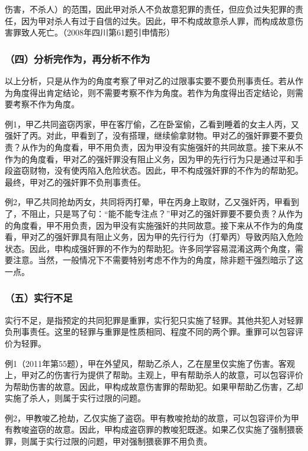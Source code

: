 伤害，不杀人）的范围，因此甲对杀人不负故意犯罪的责任，但应负过失犯罪的责任，因为甲对杀人有过于自信的过失。因此，甲不构成故意杀人罪，而构成故意伤害罪致人死亡。（2008年四川第61题引申情形）

\subsubsection*{（四）分析完作为，再分析不作为}

以上分析，只是从作为的角度考察了甲对乙的过限事实要不要负刑事责任。若从作为角度得出肯定结论，则不需要考察不作为角度。若作为角度得出否定结论，则需要考察不作为角度。

例1，甲乙共同盗窃丙家，甲在客厅偷，乙在卧室偷，乙看到睡着的女主人丙，又强奸了丙。对此，甲看到了，没有搭理，继续偷拿财物。甲对乙的强奸罪要不要负责？从作为的角度看，甲不用负责，因为甲没有实施强奸的共同故意。接下来从不作为的角度看，甲对乙的强奸罪没有阻止义务，因为甲的先行行为只是通过平和手段盗窃财物，没有使丙陷入危险状态。因此，甲不构成强奸罪的不作为的帮助犯。最终，甲对乙的强奸罪不负刑事责任。

例2，甲乙共同抢劫丙女，共同将丙打晕，甲在丙身上取财，乙又强奸丙，甲看到了，不阻止，只是骂了句：“能不能专注点？”甲对乙的强奸罪要不要负责？从作为的角度看，甲不用负责，因为甲没有实施强奸的共同故意。接下来从不作为的角度看，甲对乙的强奸罪具有阻止义务，因为甲的先行行为（打晕丙）导致丙陷入危险状态。因此，申构成强奸罪的不作为的帮助犯。许多同学容易混淆这两个角度，需要注意。当然，一般情况下不需要特别考虑不作为的角度，除非题干强烈暗示了这一点。

\subsubsection*{（五）实行不足}

实行不足，是指预定的共同犯罪是重罪，实行犯只实施了轻罪。其他共犯人对轻罪负刑事责任。这里的轻罪与重罪是性质相同、程度不同的两个罪。重罪可以包容评价为轻罪。

例1（2011年第55题），甲在外望风，帮助乙杀人，乙在屋里仅实施了伤害。客观上，甲对乙的伤害行为提供了帮助。主观上，甲有帮助杀人的故意，可以包容评价为帮助伤害的故意。因此，甲构成故意伤害罪的帮助犯。如果甲帮助乙伤害，乙却实施了杀人，则属于实行过限的问题。

例2，甲教唆乙抢劫，乙仅实施了盗窃。甲有教唆抢劫的故意，可以包容评价为甲有教唆盗窃的故意。因此，甲构成盗窃罪的教唆犯既遂。如果乙仅实施了强制猥亵罪，则属于实行过限的问题，甲对强制猥亵罪不用负责。

